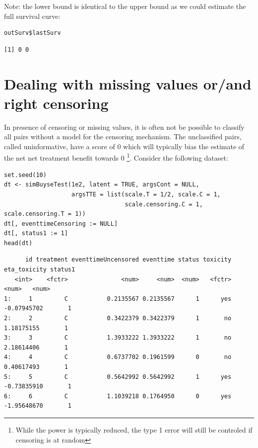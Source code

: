 \documentclass[12pt]{article}
\begin{document}
Note: the lower bound is identical to the upper bound as we could
estimate the full survival curve:
\lstset{language=r,label= ,caption= ,captionpos=b,numbers=none}
\begin{lstlisting}
outSurv$lastSurv
\end{lstlisting}

\begin{verbatim}
[1] 0 0
\end{verbatim}


\clearpage

\section{Dealing with missing values or/and right censoring}
\label{sec:org242fa15}

In presence of censoring or missing values, it is often not be
 possible to classify all pairs without a model for the censoring
 mechanism. The unclassified pairs, called uninformative, have a score
 of 0 which will typically bias the estimate of the net net treatment benefit
 towards 0 \footnote{While the power is typically reduced, the type 1 error
 will still be controled if censoring is at random}. Consider the
 following dataset:
\lstset{language=r,label= ,caption= ,captionpos=b,numbers=none}
\begin{lstlisting}
set.seed(10)
dt <- simBuyseTest(1e2, latent = TRUE, argsCont = NULL,
                   argsTTE = list(scale.T = 1/2, scale.C = 1,
                                  scale.censoring.C = 1, scale.censoring.T = 1))
dt[, eventtimeCensoring := NULL]
dt[, status1 := 1]
head(dt)
\end{lstlisting}

\begin{verbatim}
      id treatment eventtimeUncensored eventtime status toxicity eta_toxicity status1
   <int>    <fctr>               <num>     <num>  <num>   <fctr>        <num>   <num>
1:     1         C           0.2135567 0.2135567      1      yes  -0.07945702       1
2:     2         C           0.3422379 0.3422379      1       no   1.18175155       1
3:     3         C           1.3933222 1.3933222      1       no   2.18614406       1
4:     4         C           0.6737702 0.1961599      0       no   0.40617493       1
5:     5         C           0.5642992 0.5642992      1      yes  -0.73835910       1
6:     6         C           1.1039218 0.1764950      0      yes  -1.95648670       1
\end{verbatim}
\end{document}
